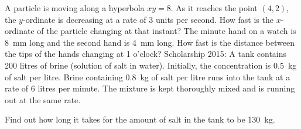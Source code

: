 \begin{questions}
  \questioE A particle is moving along a hyperbola $ xy = 8 $. As it reaches the point $ (4, 2) $, the $ y$-ordinate is decreasing
            at a rate of 3 units per second. How fast is the $ x$-ordinate of the particle changing at that instant?
  \questioE The minute hand on a watch is \SI{8}{\milli\metre} long and the second hand is \SI{4}{\milli\metre} long. How fast is
            the distance between the tips of the hands changing at 1 o'clock?
  \questioS Scholarship 2015: A tank contains 200 litres of brine (solution of salt in water). Initially, the concentration is \SI{0.5}{\kilo\gram}
            of salt per litre. Brine containing \SI{0.8}{\kilo\gram} of salt per litre runs into the tank at a rate of 6 litres per
            minute. The mixture is kept thoroughly mixed and is running out at the same rate.

            Find out how long it takes for the amount of salt in the tank to be \SI{130}{\kilo\gram}.
\end{questions}

